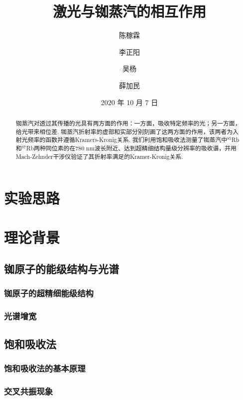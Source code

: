\documentclass[a4paper, 10pt]{article}
\begin{document}
\title{激光与铷蒸汽的相互作用}
\author{陈稼霖\and 李正阳\and 吴杨\and 薛加民}
\date{2020 年 10 月 7 日}
\maketitle
\begin{abstract}
    铷蒸汽对透过其传播的光具有两方面的作用：一方面，吸收特定频率的光；另一方面，给光带来相位差. 铷蒸汽折射率的虚部和实部分别刻画了这两方面的作用，该两者为入射光频率的函数并遵循Kramers-Kronig关系. 我们利用饱和吸收法测量了铷蒸汽中$^{85}$Rb和$^{87}$Rb两种同位素的在$780$ nm波长附近、达到超精细结构量级分辨率的吸收谱，并用Mach-Zehnder干涉仪验证了其折射率满足的Kramer-Kronig关系.
\end{abstract}

\begin{multicols}{2}
\section{实验思路}

\section{理论背景}

\subsection{铷原子的能级结构与光谱}

\subsubsection{铷原子的超精细能级结构}

\subsubsection{光谱增宽}

\subsection{饱和吸收法}

\subsubsection{饱和吸收法的基本原理}

\subsubsection{交叉共振现象}


\end{multicols}
\end{document}
